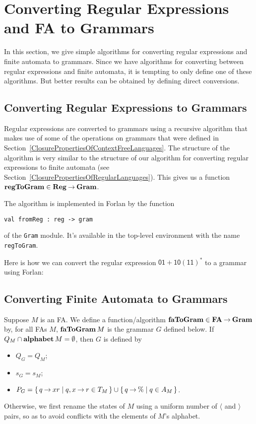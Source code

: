 \section{Converting Regular Expressions and FA to Grammars}
\label{ConvertingRegularExpressionsAndFAToGrammars}

In this section, we give simple algorithms for converting regular
expressions and finite automata to grammars.  Since we have algorithms
for converting between regular expressions and finite automata, it is
tempting to only define one of these algorithms.  But better results
can be obtained by defining direct conversions.

\subsection{Converting Regular Expressions to Grammars}

Regular expressions are converted to grammars using a recursive
algorithm that makes use of some of the operations on grammars that
were defined in Section~\ref{ClosurePropertiesOfContextFreeLanguages}.
The structure of the algorithm is very similar to the structure of our
algorithm for converting regular expressions to finite automata (see
Section~\ref{ClosurePropertiesOfRegularLanguages}).  This
gives us a function $\mathbf{regToGram}\in\mathbf{Reg}\mathbin{\to}\mathbf{Gram}$.

The algorithm is implemented in Forlan by the function
\begin{verbatim}
val fromReg : reg -> gram
\end{verbatim}
of the \texttt{Gram} module.  It's available in the top-level
environment with the name \texttt{regToGram}.

Here is how we can convert the regular expression $\mathsf{01 +
10(11)^*}$ to a grammar using Forlan:


\subsection{Converting Finite Automata to Grammars}

Suppose $M$ is an FA. We define a function/algorithm $\mathbf{faToGram}\in
\mathbf{FA}\mathbin{\to}\mathbf{Gram}$ by, for all FAs $M$, $\mathbf{faToGram}\,M$ is the grammar
$G$ defined below. If $Q_M\cap\mathbf{alphabet}\,M=\emptyset$, then $G$ is
defined by
\begin{itemize}
\item $Q_G = Q_M$;

\item $s_G = s_M$;

\item $P_G = \{ \, q\mathbin{\to} xr \mid q,x\mathbin{\to} r\in T_M \, \} \cup
  \{ \, q\mathbin{\to}\% \mid q\in A_M \, \}$.
\end{itemize}
Otherwise, we first rename the states of $M$ using a uniform
number of $\langle$ and $\rangle$ pairs, so as to avoid conflicts
with the elements of $M$'s alphabet.

